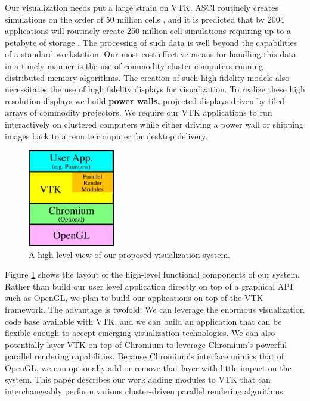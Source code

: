\documentclass{acmsiggraph}
\newcommand{\keyterm}[1]{\textbf{#1}}
\begin{document}
  Our visualization needs put a large strain on VTK.  ASCI routinely
  creates simulations on the order of 50 million cells \cite{Heermann99},
  and it is predicted that by 2004 applications will routinely create 250
  million cell simulations requiring up to a petabyte of storage
  \cite{Smith98}.  The processing of such data is well beyond the
  capabilities of a standard workstation.  Our most cost effective means
  for handling this data in a timely manner is the use of commodity cluster
  computers running distributed memory algorithms.  The creation of such
  high fidelity models also necessitates the use of high fidelity displays
  for visualization.  To realize these high resolution displays we build
  \keyterm{power walls,} projected displays driven by tiled arrays of
  commodity projectors.  We require our VTK applications to run
  interactively on clustered computers while either driving a power wall or
  shipping images back to a remote computer for desktop delivery.

  \begin{figure}
    \center
    \includegraphics[width=1.5in]{images/AppLayers}
    \caption{A high level view of our proposed visualization system.}
    \label{fig:applayers}
  \end{figure}
  Figure \ref{fig:applayers} shows the layout of the high-level functional
  components of our system.  Rather than build our user level application
  directly on top of a graphical API such as OpenGL, we plan to build our
  applications on top of the VTK framework.  The advantage is twofold: We
  can leverage the enormous visualization code base available with VTK, and
  we can build an application that can be flexible enough to accept
  emerging visualization technologies.  We can also potentially layer VTK
  on top of Chromium to leverage Chromium's powerful parallel rendering
  capabilities.  Because Chromium's interface mimics that of OpenGL, we can
  optionally add or remove that layer with little impact on the system.
  This paper describes our work adding modules to VTK that can
  interchangeably perform various cluster-driven parallel rendering
  algorithms.
\end{document}
